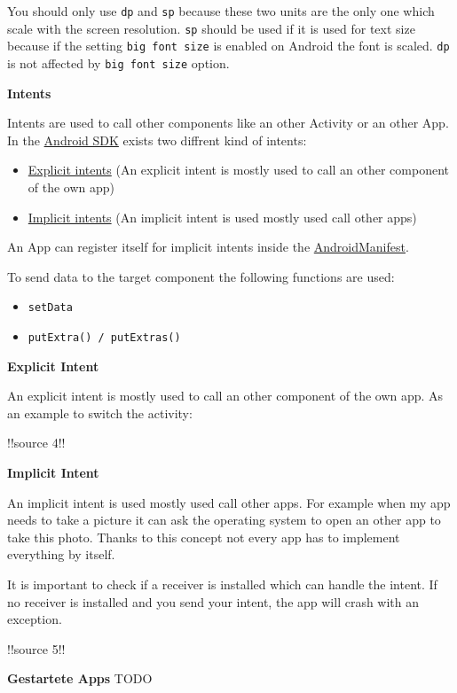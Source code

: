 \documentclass[11pt,twoside,landscape]{article}
\begin{document}
\begin{multicols}{3}
You should only use \texttt{dp} and \texttt{sp} because these two units are the only one which scale with the screen resolution.
\texttt{sp} should be used if it is used for text size because if the setting \texttt{big font size} is enabled on Android the font is scaled.
\texttt{dp} is not affected by \texttt{big font size} option.


\textbf{Intents}

Intents are used to call other components like an other Activity or an other App.
In the \href{../../../roam/20210928175951-android_sdk.org}{Android SDK} exists two diffrent kind of intents:
\begin{itemize}
\item \href{../../../roam/20211002180419-explicit_intents.org}{Explicit intents} (An explicit intent is mostly used to call an other component of the own app)
\item \href{../../../roam/20211002180703-implicit_intents.org}{Implicit intents} (An implicit intent is used mostly used call other apps)
\end{itemize}

An App can register itself for implicit intents inside the \href{../../../roam/20210921175054-androidmanifest.org}{AndroidManifest}.

To send data to the target component the following functions are used:
\begin{itemize}
\item \texttt{setData}
\item \texttt{putExtra() / putExtras()}
\end{itemize}


\textbf{Explicit Intent}

An explicit intent is mostly used to call an other component of the own app.
As an example to switch the activity:

!!source 4!!

\textbf{Implicit Intent}

An implicit intent is used mostly used call other apps.
For example when my app needs to take a picture it can ask the operating system to open an other app to take this photo.
Thanks to this concept not every app has to implement everything by itself.

It is important to check if a receiver is installed which can handle the intent.
If no receiver is installed and you send your intent, the app will crash with an exception.

!!source 5!!

\textbf{Gestartete Apps}
TODO



\end{multicols}
\end{document}

